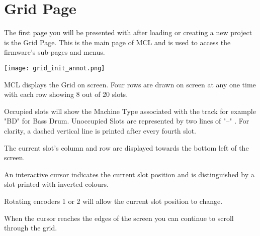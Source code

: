 
\chapter{Grid Page}
The first page you will be presented with after loading or creating a new project is the Grid Page. This is the main page of MCL and is used to access the firmware's sub-pages and menus.

\begin{center}
	\texttt{[image: grid\_init\_annot.png]}
\end{center}
MCL displays the Grid on screen. Four rows are drawn on screen at any one time with each row showing 8 out of 20 slots.

Occupied slots will show the Machine Type associated with the track for example "BD" for Bass Drum. Unoccupied Slots are represented by two lines of "--" . For clarity, a dashed vertical line is printed after every fourth slot. 

The current slot's column and row are displayed towards the bottom left of the screen.

An interactive cursor indicates the current slot position and is distinguished by a slot printed with inverted colours.


Rotating encoders 1 or 2 will allow the current slot position to change.

When the cursor reaches the edges of the screen you can continue to scroll through the grid.